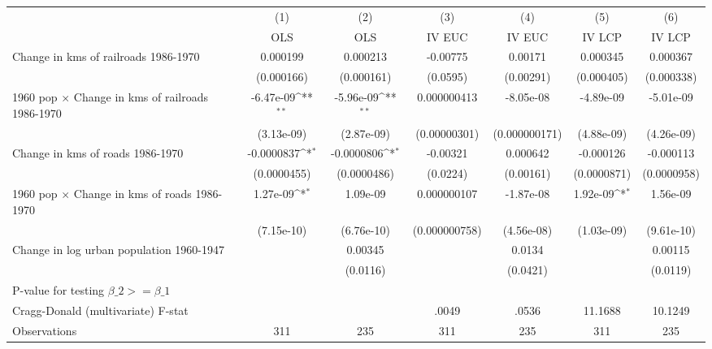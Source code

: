 {
\def\sym#1{\ifmmode^{#1}\else\(^{#1}\)\fi}
\begin{tabular}{l*{6}{c}}
\hline\hline
                &\multicolumn{1}{c}{(1)}&\multicolumn{1}{c}{(2)}&\multicolumn{1}{c}{(3)}&\multicolumn{1}{c}{(4)}&\multicolumn{1}{c}{(5)}&\multicolumn{1}{c}{(6)}\\
                &\multicolumn{1}{c}{OLS}&\multicolumn{1}{c}{OLS}&\multicolumn{1}{c}{IV EUC}&\multicolumn{1}{c}{IV EUC}&\multicolumn{1}{c}{IV LCP}&\multicolumn{1}{c}{IV LCP}\\
\hline
Change in kms of railroads 1986-1970& 0.000199         & 0.000213         & -0.00775         &  0.00171         & 0.000345         & 0.000367         \\
                &(0.000166)         &(0.000161)         & (0.0595)         &(0.00291)         &(0.000405)         &(0.000338)         \\
[1em]
1960 pop $\times$ Change in kms of railroads 1986-1970&-6.47e-09\sym{**} &-5.96e-09\sym{**} &0.000000413         &-8.05e-08         &-4.89e-09         &-5.01e-09         \\
                &(3.13e-09)         &(2.87e-09)         &(0.00000301)         &(0.000000171)         &(4.88e-09)         &(4.26e-09)         \\
[1em]
Change in kms of roads 1986-1970&-0.0000837\sym{*}  &-0.0000806\sym{*}  & -0.00321         & 0.000642         &-0.000126         &-0.000113         \\
                &(0.0000455)         &(0.0000486)         & (0.0224)         &(0.00161)         &(0.0000871)         &(0.0000958)         \\
[1em]
1960 pop $\times$ Change in kms of roads 1986-1970& 1.27e-09\sym{*}  & 1.09e-09         &0.000000107         &-1.87e-08         & 1.92e-09\sym{*}  & 1.56e-09         \\
                &(7.15e-10)         &(6.76e-10)         &(0.000000758)         &(4.56e-08)         &(1.03e-09)         &(9.61e-10)         \\
[1em]
Change in log urban population 1960-1947&                  &  0.00345         &                  &   0.0134         &                  &  0.00115         \\
                &                  & (0.0116)         &                  & (0.0421)         &                  & (0.0119)         \\
\hline
P-value for testing $\beta\_{2} >= \beta\_{1}$&                  &                  &                  &                  &                  &                  \\
Cragg-Donald (multivariate) F-stat&                  &                  &    .0049         &    .0536         &  11.1688         &  10.1249         \\
Observations    &      311         &      235         &      311         &      235         &      311         &      235         \\
\hline\hline
\end{tabular}
}
